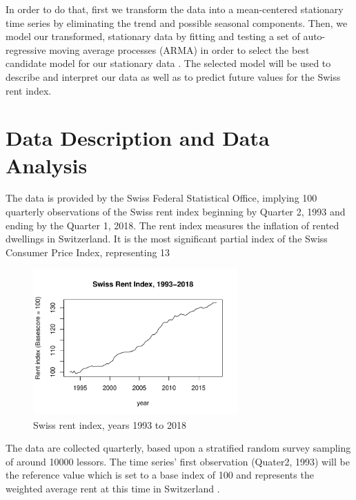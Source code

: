 \documentclass[11pt,a4paper]{article}
\begin{document}
In order to do that, first we transform the data into a mean-centered stationary time series by eliminating the trend and possible seasonal components.
Then, we model our transformed, stationary data by fitting and testing a set of auto-regressive moving average processes (ARMA) in order to select the best candidate model for our stationary data \cite[p.~82--110]{bd02}.
The selected model will be used to describe and interpret our data as well as to predict future values for the Swiss rent index.



\section{Data Description and Data Analysis}

The data is provided by the Swiss Federal Statistical Office, implying 100 quarterly observations of the Swiss rent index beginning by Quarter 2, 1993 and ending by the Quarter 1, 2018.
The rent index measures the inflation of rented dwellings in Switzerland.
It is the most significant partial index of the Swiss Consumer Price Index, representing 13%

\begin{figure}
    \centering
    \includegraphics[width=0.7\textwidth]{indiceloyers_timeseries}
    \caption{Swiss rent index, years 1993 to 2018}
    \label{fig:indiceloyers_timeseries}
\end{figure}

The data are collected quarterly, based upon a stratified random survey sampling of around \num{10000} lessors.
The time series' first observation (Quater2, 1993) will be the reference value which is set to a base index of 100 and represents the weighted average rent at this time in Switzerland \cite[p.~20--23]{ofs}.
\end{document}
